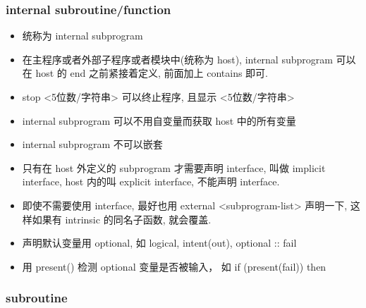 \subsubsection{internal subroutine/function}
\begin{itemize}
\item 统称为 internal subprogram
\item 在主程序或者外部子程序或者模块中(统称为 host), internal subprogram 可以在 host 的 end 之前紧接着定义, 前面加上 contains 即可.
\item  stop <5位数/字符串> 可以终止程序, 且显示 <5位数/字符串>
\item internal subprogram 可以不用自变量而获取 host 中的所有变量
\item internal subprogram 不可以嵌套
\item 只有在 host 外定义的 subprogram 才需要声明 interface, 叫做 implicit interface, host 内的叫 explicit interface, 不能声明 interface.
\item 即使不需要使用 interface, 最好也用 external <subprogram-list> 声明一下, 这样如果有 intrinsic 的同名子函数, 就会覆盖.
\item 声明默认变量用 optional, 如 logical, intent(out), optional :: fail
\item 用 present() 检测 optional 变量是否被输入， 如 if (present(fail)) then
\end{itemize}

\subsubsection{subroutine}


